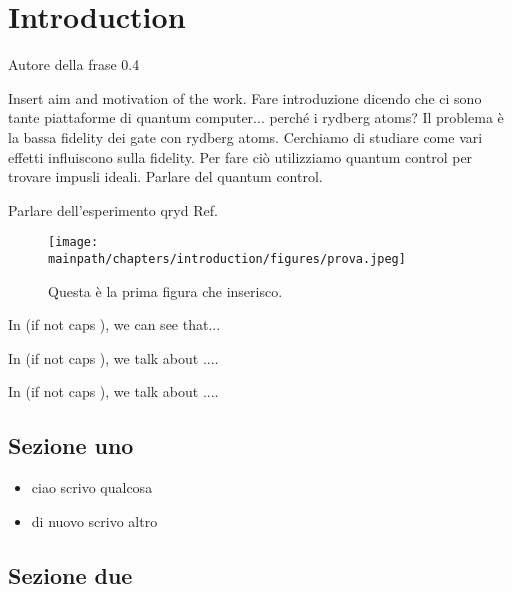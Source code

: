 \documentclass[\mainpath/main/main.tex]{subfiles}
\begin{document}


\chapter[Introduction]{Introduction}
\label{ch:introduction}


%
{Autore della frase}%
{0.4\linewidth}

\noindent Insert aim and motivation of the work. Fare introduzione dicendo che ci sono tante piattaforme di quantum computer... perché i rydberg atoms? Il problema è la bassa fidelity dei gate con rydberg atoms. Cerchiamo di studiare come vari effetti influiscono sulla fidelity. Per fare ciò utilizziamo quantum control per trovare impusli ideali. Parlare del quantum control.

Parlare dell'esperimento qryd Ref.~\cite{Aaronson2011}


\begin{figure}[h!]
\centering
\texttt{[image: \\mainpath/chapters/introduction/figures/prova.jpeg]}
\caption[Short caption]{\label{fig:} Questa è la prima figura che inserisco.}
\end{figure}

In  (if not caps ), we can see that...

In  (if not caps ), we talk about ....

In  (if not caps ), we talk about ....

\section{Sezione uno}

\lipsum[1]

\begin{itemize}
\item ciao scrivo qualcosa
\item di nuovo scrivo altro
\end{itemize}

\section{Sezione due}
\end{document}
